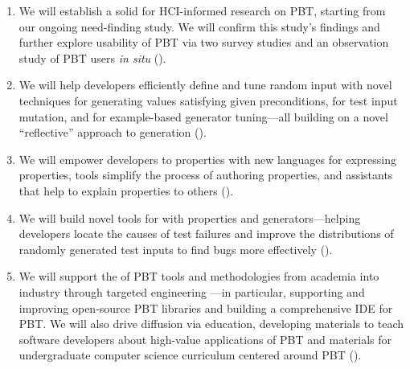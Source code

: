 \begin{enumerate}[noitemsep]
\item We will establish a solid  for HCI-informed research on PBT,
starting from our ongoing need-finding study. We will confirm
this study's findings and further explore usability of PBT via
two survey studies and an observation study
of PBT users {\em in situ} ().
%
\item We will help developers efficiently define and tune random input
 with novel techniques for generating values
satisfying given preconditions, for test input mutation, and for
example-based generator tuning---all building on a novel
``reflective'' approach to generation ().
%
\item We will empower developers to  properties with new
languages for expressing properties, tools simplify the process of authoring
properties, and assistants that help to explain properties to others
().
%
\item We will build novel tools for  with properties
and generators---helping developers locate the causes of test
failures and improve the distributions of randomly
generated test inputs to find bugs more effectively ().
%
\item We will support the  of PBT tools and
methodologies from academia into industry through targeted engineering
---in particular, supporting and
improving open-source PBT libraries and building a comprehensive IDE for PBT.
We will also drive diffusion via education, developing materials to teach
software developers about high-value applications of PBT and materials for
undergraduate computer science curriculum centered around
PBT
().  \iflater{}\fi
\end{enumerate}
